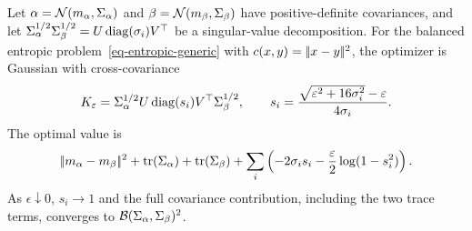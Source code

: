 \begin{prop}\label{prop-gaussian-sinkhorn-closed-form}
	Let $\alpha=\mathcal{N}(m_\alpha,\Sigma_\alpha)$ and $\beta=\mathcal{N}(m_\beta,\Sigma_\beta)$ have positive-definite covariances, and let $\Sigma_\alpha^{1/2}\Sigma_\beta^{1/2}=U\operatorname{diag}(\sigma_i)V^\top$ be a singular-value decomposition. For the balanced entropic problem~\eqref{eq-entropic-generic} with $c(x,y)=|\!| x-y |\!|^2$,
	the optimizer is Gaussian with cross-covariance
	\[
		K_\varepsilon
		=
		\Sigma_\alpha^{1/2}
		U\operatorname{diag}(s_i)V^\top
		\Sigma_\beta^{1/2},
		\qquad
		s_i
		=
		\frac{\sqrt{\varepsilon^2+16\sigma_i^2}-\varepsilon}{4\sigma_i}.
	\]
	The optimal value is
	\[
		|\!| m_\alpha-m_\beta |\!|^2
		+
		\operatorname{tr}(\Sigma_\alpha)+\operatorname{tr}(\Sigma_\beta)
		+
		\sum_i
		\left(
			-2\sigma_i s_i
			-\frac{\varepsilon}{2}\log(1-s_i^2)
		\right).
	\]
	As $\epsilon\downarrow0$, $s_i\to1$ and the full covariance contribution, including the two trace terms, converges to $\mathcal{B}(\Sigma_\alpha,\Sigma_\beta)^2$.
\end{prop}

